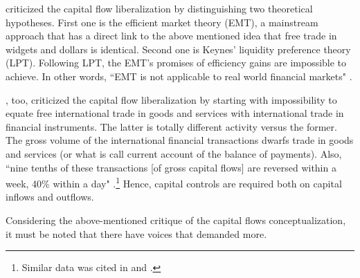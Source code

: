 \cite{davidson2000} criticized the capital flow liberalization by distinguishing two theoretical hypotheses.
First one is the efficient market theory (EMT), a mainstream approach that has a direct link to the above mentioned idea that free trade in widgets and dollars is identical.
Second one is Keynes' liquidity preference theory (LPT).
Following LPT, the EMT's promises of efficiency gains are impossible to achieve.
In other words, ``EMT is not applicable to real world financial markets" \citep[p.~1117]{davidson2000}.

\cite{tobin2000}, too, criticized the capital flow liberalization by starting with impossibility to equate free international trade in goods and services with international trade in financial instruments. The latter is totally different activity versus the former. The gross volume of the international financial transactions dwarfs trade in goods and services (or what is call current account of the balance of payments). Also, ``nine tenths of these transactions [of gross capital flows] are reversed within a week, 40\% within a day" \citep[p.~1101]{tobin2000}.\footnote{Similar data was cited in \citep[pp.~3-4]{haq1996} and \citep[p.~330, end-note 3]{kirshner1999}.} Hence, capital controls are required both on capital inflows and outflows.

Considering the above-mentioned critique of the capital flows conceptualization, it must be noted that there have voices that demanded more.

